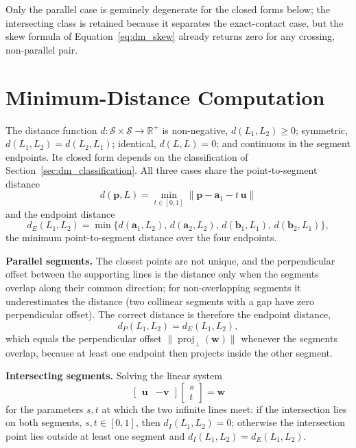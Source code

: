 Only the parallel case is genuinely degenerate for the closed forms below; the intersecting class is
retained because it separates the exact-contact case, but the skew formula of
Equation~\eqref{eq:dm_skew} already returns zero for any crossing, non-parallel pair.

\section{Minimum-Distance Computation}\label{sec:dm_distance}

The distance function $d : \mathcal{S} \times \mathcal{S} \to \mathbb{R}^{+}$ is non-negative,
$d(L_1, L_2) \geq 0$; symmetric, $d(L_1, L_2) = d(L_2, L_1)$; identical, $d(L, L) = 0$; and continuous
in the segment endpoints. Its closed form depends on the classification of
Section~\ref{sec:dm_classification}. All three cases share the point-to-segment distance
\begin{equation}
d(\mathbf{p}, L) = \min_{t \in [0,1]} \lVert \mathbf{p} - \mathbf{a}_1 - t\,\mathbf{u} \rVert
\label{eq:dm_pointseg}
\end{equation}
and the endpoint distance
\begin{equation}
d_E(L_1, L_2) = \min\{ d(\mathbf{a}_1, L_2),\, d(\mathbf{a}_2, L_2),\,
d(\mathbf{b}_1, L_1),\, d(\mathbf{b}_2, L_1) \},
\label{eq:dm_endpoint}
\end{equation}
the minimum point-to-segment distance over the four endpoints.

\textbf{Parallel segments.} The closest points are not unique, and the perpendicular offset between
the supporting lines is the distance only when the segments overlap along their common direction;
for non-overlapping segments it underestimates the distance (two collinear segments with a gap have
zero perpendicular offset). The correct distance is therefore the endpoint distance,
\begin{equation}
d_P(L_1, L_2) = d_E(L_1, L_2),
\label{eq:dm_parallel}
\end{equation}
which equals the perpendicular offset $\lVert \operatorname{proj}_{\perp}(\mathbf{w}) \rVert$ whenever
the segments overlap, because at least one endpoint then projects inside the other segment.

\textbf{Intersecting segments.} Solving the linear system
\begin{equation}
\begin{bmatrix} \mathbf{u} & -\mathbf{v} \end{bmatrix} \begin{bmatrix} s \\ t \end{bmatrix} = \mathbf{w}
\label{eq:dm_intersect}
\end{equation}
for the parameters $s, t$ at which the two infinite lines meet: if the intersection lies on both
segments, $s, t \in [0,1]$, then $d_I(L_1, L_2) = 0$; otherwise the intersection point lies outside
at least one segment and $d_I(L_1, L_2) = d_E(L_1, L_2)$.

